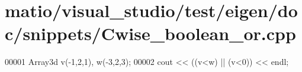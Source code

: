 \hypertarget{matio_2visual__studio_2test_2eigen_2doc_2snippets_2_cwise__boolean__or_8cpp_source}{}\section{matio/visual\+\_\+studio/test/eigen/doc/snippets/\+Cwise\+\_\+boolean\+\_\+or.cpp}
\label{matio_2visual__studio_2test_2eigen_2doc_2snippets_2_cwise__boolean__or_8cpp_source}

\begin{DoxyCode}
00001 Array3d v(-1,2,1), w(-3,2,3);
00002 cout << ((v<w) || (v<0)) << endl;
\end{DoxyCode}
